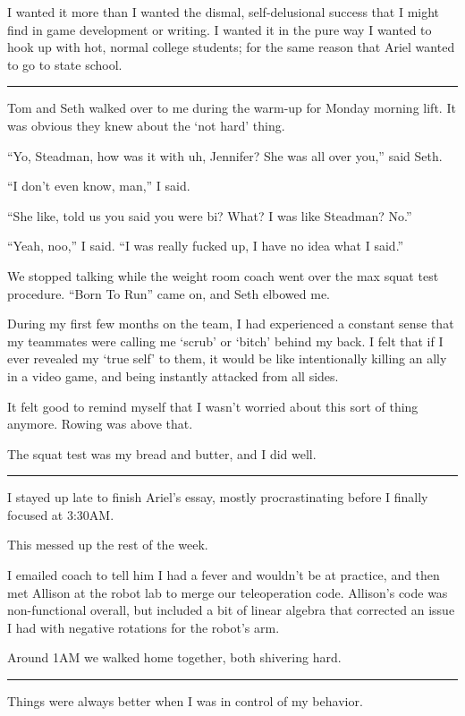 I wanted it more than I wanted the dismal, self-delusional success that I might
find in game development or writing.  I wanted it in the pure way I wanted to
hook up with hot, normal college students; for the same reason that Ariel
wanted to go to state school.

\plainfancybreak{12pt}{2}{}

Tom and Seth walked over to me during the warm-up for Monday morning lift.  It
was obvious they knew about the `not hard' thing.

``Yo, Steadman, how was it with uh, Jennifer?  She was all over you,'' said
Seth.

``I don't even know, man,'' I said.

``She like, told us you said you were bi?  What?  I was like Steadman?
No.''

``Yeah, noo,'' I said. ``I was really fucked up, I have no idea what I said.''

We stopped talking while the weight room coach went over the max squat test
procedure.  ``Born To Run'' came on, and Seth elbowed me.

During my first few months on the team, I had experienced a constant sense that
my teammates were calling me `scrub' or `bitch' behind my back.  I felt that if
I ever revealed my `true self' to them, it would be like intentionally killing
an ally in a video game, and being instantly attacked from all sides.

It felt good to remind myself that I wasn't worried about this sort of thing
anymore.  Rowing was above that.

The squat test was my bread and butter, and I did well.

\plainfancybreak{12pt}{2}{}

I stayed up late to finish Ariel's essay, mostly procrastinating before I
finally focused at 3:30AM.

This messed up the rest of the week.

I emailed coach to tell him I had a fever and wouldn't be at practice, and then
met Allison at the robot lab to merge our teleoperation code.   Allison's code
was non-functional overall, but included a bit of linear algebra that corrected
an issue I had with negative rotations for the robot's arm.

Around 1AM we walked home together, both shivering hard.

\plainfancybreak{12pt}{2}{}

Things were always better when I was in control of my behavior.

